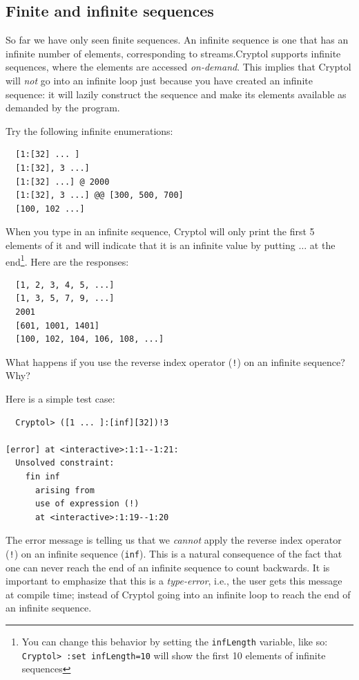 \subsection{Finite and infinite sequences}\indFiniteSeq\indInfSeq
\label{sec:finite-infin-sequ}

So far we have only seen finite sequences.  An infinite sequence is one
that has an infinite number of elements, corresponding to
streams.\indStream  Cryptol supports infinite sequences, where the
elements are accessed {\em on-demand}.  This implies that Cryptol will
{\em not} go into an infinite loop just because you have created an
infinite sequence: it will lazily construct the sequence and make its
elements available as demanded by the program.

\begin{Exercise}\label{ex:seq:9}
Try the following infinite enumerations:
\begin{Verbatim}
  [1:[32] ... ]
  [1:[32], 3 ...]
  [1:[32] ...] @ 2000
  [1:[32], 3 ...] @@ [300, 500, 700]
  [100, 102 ...]
\end{Verbatim}
\end{Exercise}
\begin{Answer}
  When you type in an infinite sequence, Cryptol will only print the
  first 5 elements of it and will indicate that it is an infinite value
  by putting $\ldots$ at the end\footnote{You can change this behavior
    by setting the {\tt infLength} variable, like so: {\tt Cryptol>
      :set infLength=10} will show the first 10 elements of infinite
    sequences}. Here are the responses:
\begin{Verbatim}
  [1, 2, 3, 4, 5, ...]
  [1, 3, 5, 7, 9, ...]
  2001
  [601, 1001, 1401]
  [100, 102, 104, 106, 108, ...]
\end{Verbatim}
\end{Answer}
\begin{Exercise}\label{ex:seq:10}
  What happens if you use the reverse index operator ({\tt !}) on an
  infinite sequence? Why?
\end{Exercise}
\begin{Answer}
Here is a simple test case:
\begin{Verbatim}
  Cryptol> ([1 ... ]:[inf][32])!3

[error] at <interactive>:1:1--1:21:
  Unsolved constraint:
    fin inf
      arising from
      use of expression (!)
      at <interactive>:1:19--1:20
\end{Verbatim}
The error message is telling us that we {\em cannot} apply the reverse
index operator ({\tt !}) on an infinite sequence (\texttt{inf}).  This
is a natural consequence of the fact that one can never reach the end
of an infinite sequence to count backwards.  It is important to
emphasize that this is a {\em type-error}, i.e., the user gets this
message at compile time; instead of Cryptol going into an infinite
loop to reach the end of an infinite sequence.
\end{Answer}

